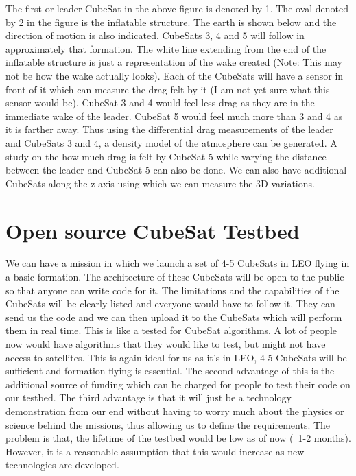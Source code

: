 \documentclass[11pt,a4paper]{article}
\begin{document}
The first or leader CubeSat in the above figure is denoted by 1. The oval denoted by 2 in the figure is the inflatable structure. The earth is shown below and the direction of motion is also indicated. CubeSats 3, 4 and 5 will follow in approximately that formation. The white line extending from the end of the inflatable structure is just a representation of the wake created (Note: This may not be how the wake actually looks).  Each of the CubeSats will have a sensor in front of it which can measure the drag felt by it (I am not yet sure what this sensor would be). CubeSat 3 and 4 would feel less drag as they are in the immediate wake of the leader. CubeSat 5 would feel much more than 3 and 4 as it is farther away. Thus using the differential drag measurements of the leader and CubeSats 3 and 4, a density model of the atmosphere can be generated. A study on the how much drag is felt by CubeSat 5 while varying the distance between the leader and CubeSat 5 can also be done. We can also have additional CubeSats along the z axis using which we can measure the 3D variations. 

\section{Open source CubeSat Testbed}

We can have a mission in which we launch a set of 4-5 CubeSats in LEO flying in a basic formation. The architecture of these CubeSats will be open to the public so that anyone can write code for it. The limitations and the capabilities of the CubeSats will be clearly listed and everyone would have to follow it. They can send us the code and we can then upload it to the CubeSats which will perform them in real time. This is like a tested for CubeSat algorithms. A lot of people now would have algorithms that they would like to test, but might not have access to satellites. This is again ideal for us as it's in LEO, 4-5 CubeSats will be sufficient and formation flying is essential. The second advantage of this is the additional source of funding which can be charged for people to test their code on our testbed. The third advantage is that it will just be a technology demonstration from our end without having to worry much about the physics or science behind the missions, thus allowing us to define the requirements. The problem is that, the lifetime of the testbed would be low as of now (~1-2 months). However, it is a reasonable assumption that this would increase as new technologies are developed. 
\end{document}
